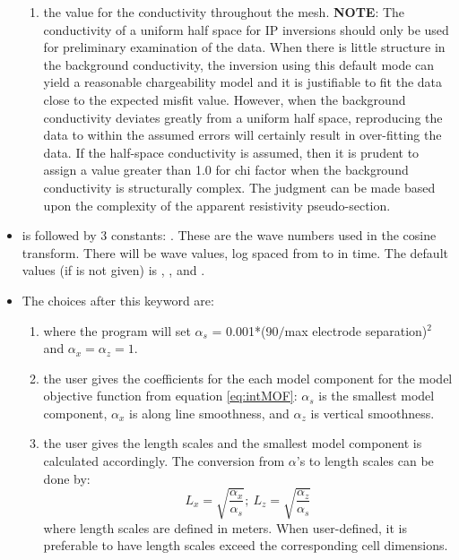 \begin{itemize}
\begin{enumerate}
\item{} the value for the conductivity throughout the mesh. \textbf{NOTE}: The conductivity of a uniform half space for IP inversions should only be used for preliminary examination of the data. When there is little structure in the background conductivity, the inversion using this default mode can yield a reasonable chargeability model and it is justifiable to fit the data close to the expected misfit value. However, when the background conductivity deviates greatly from a uniform half space, reproducing the data to within the assumed errors will certainly result in over-fitting the data. If the half-space conductivity is assumed, then it is prudent to assign a value greater than 1.0 for chi factor when the background conductivity is structurally complex. The judgment can be made based upon the complexity of the apparent resistivity pseudo-section.
\end{enumerate}
%
\item[\fileName{WAVE}] is followed by 3 constants: . These are the wave numbers used in the cosine transform. There will be  wave values, log spaced from  to  in time. The default values (if  is not given) is , , and .
%
\item [\fileName{ALPHA}] The choices after this keyword are: 
\begin{enumerate}
\item {} where the program will set $\alpha_s$ = 0.001*(90$/$max electrode separation)$^2$ and $\alpha_x = \alpha_z = 1$. 
\item {} the user gives the coefficients for the each model component for the model objective function from equation \ref{eq:intMOF}: $\alpha_s$ is the smallest model component, $\alpha_x$ is along line smoothness, and $\alpha_z$ is vertical smoothness.
\item{} the user gives the length scales and the smallest model component is calculated accordingly. The conversion from $\alpha$'s to length scales can be done by:
\begin{equation}
L_x = \sqrt{\frac{\alpha_x}{\alpha_s}} ; ~L_z = \sqrt{\frac{\alpha_z}{\alpha_s}}
\end{equation}
where length scales are defined in meters. When user-defined, it is preferable to have length scales exceed the corresponding cell dimensions.

\end{enumerate}
\end{itemize}
